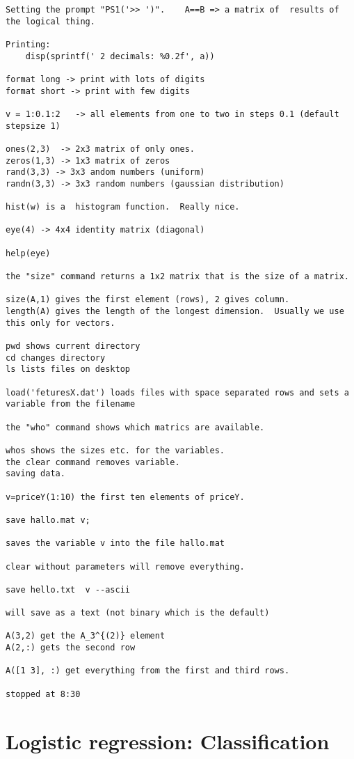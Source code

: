 \documentclass[a4, 12pt, english, USenglish]{scrreprt}
\begin{document}
\begin{verbatim}
Setting the prompt "PS1('>> ')".    A==B => a matrix of  results of the logical thing.

Printing:
    disp(sprintf(' 2 decimals: %0.2f', a))

format long -> print with lots of digits
format short -> print with few digits

v = 1:0.1:2   -> all elements from one to two in steps 0.1 (default stepsize 1)

ones(2,3)  -> 2x3 matrix of only ones.
zeros(1,3) -> 1x3 matrix of zeros
rand(3,3) -> 3x3 andom numbers (uniform)
randn(3,3) -> 3x3 random numbers (gaussian distribution)

hist(w) is a  histogram function.  Really nice.

eye(4) -> 4x4 identity matrix (diagonal)

help(eye) 

the "size" command returns a 1x2 matrix that is the size of a matrix.

size(A,1) gives the first element (rows), 2 gives column.
length(A) gives the length of the longest dimension.  Usually we use this only for vectors.

pwd shows current directory
cd changes directory
ls lists files on desktop

load('feturesX.dat') loads files with space separated rows and sets a variable from the filename

the "who" command shows which matrics are available.

whos shows the sizes etc. for the variables.
the clear command removes variable.
saving data.

v=priceY(1:10) the first ten elements of priceY.

save hallo.mat v; 

saves the variable v into the file hallo.mat

clear without parameters will remove everything.

save hello.txt  v --ascii 

will save as a text (not binary which is the default)

A(3,2) get the A_3^{(2)} element
A(2,:) gets the second row 

A([1 3], :) get everything from the first and third rows.

stopped at 8:30
\end{verbatim}




\chapter{Logistic regression: Classification}
\end{document}
